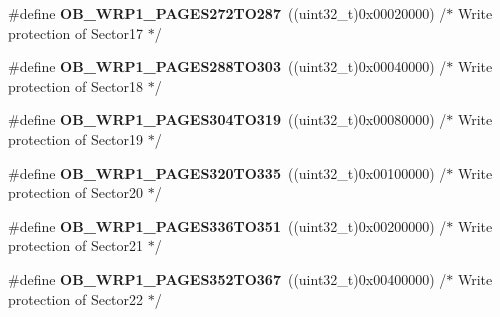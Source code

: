 \begin{DoxyCompactItemize}
\item 
\hypertarget{group___f_l_a_s_h_ex___option___bytes___write___protection1_gaeeca9479f273ad1e6792a297e801ef18}{\#define {\bfseries O\-B\-\_\-\-W\-R\-P1\-\_\-\-P\-A\-G\-E\-S272\-T\-O287}~((uint32\-\_\-t)0x00020000) /$\ast$ Write protection of Sector17 $\ast$/}\label{group___f_l_a_s_h_ex___option___bytes___write___protection1_gaeeca9479f273ad1e6792a297e801ef18}

\item 
\hypertarget{group___f_l_a_s_h_ex___option___bytes___write___protection1_ga16971dcdfbafabfe552b5d8f3aa78468}{\#define {\bfseries O\-B\-\_\-\-W\-R\-P1\-\_\-\-P\-A\-G\-E\-S288\-T\-O303}~((uint32\-\_\-t)0x00040000) /$\ast$ Write protection of Sector18 $\ast$/}\label{group___f_l_a_s_h_ex___option___bytes___write___protection1_ga16971dcdfbafabfe552b5d8f3aa78468}

\item 
\hypertarget{group___f_l_a_s_h_ex___option___bytes___write___protection1_gaa1bd7bb5b0e9c2171c13f08967119a89}{\#define {\bfseries O\-B\-\_\-\-W\-R\-P1\-\_\-\-P\-A\-G\-E\-S304\-T\-O319}~((uint32\-\_\-t)0x00080000) /$\ast$ Write protection of Sector19 $\ast$/}\label{group___f_l_a_s_h_ex___option___bytes___write___protection1_gaa1bd7bb5b0e9c2171c13f08967119a89}

\item 
\hypertarget{group___f_l_a_s_h_ex___option___bytes___write___protection1_ga0e3542f2b50f94ad6ad4bad0d1ac4a1f}{\#define {\bfseries O\-B\-\_\-\-W\-R\-P1\-\_\-\-P\-A\-G\-E\-S320\-T\-O335}~((uint32\-\_\-t)0x00100000) /$\ast$ Write protection of Sector20 $\ast$/}\label{group___f_l_a_s_h_ex___option___bytes___write___protection1_ga0e3542f2b50f94ad6ad4bad0d1ac4a1f}

\item 
\hypertarget{group___f_l_a_s_h_ex___option___bytes___write___protection1_ga843ceb8570515e4a1308161488d2eaed}{\#define {\bfseries O\-B\-\_\-\-W\-R\-P1\-\_\-\-P\-A\-G\-E\-S336\-T\-O351}~((uint32\-\_\-t)0x00200000) /$\ast$ Write protection of Sector21 $\ast$/}\label{group___f_l_a_s_h_ex___option___bytes___write___protection1_ga843ceb8570515e4a1308161488d2eaed}

\item 
\hypertarget{group___f_l_a_s_h_ex___option___bytes___write___protection1_gae261af190c20db2e3c94db13324644fc}{\#define {\bfseries O\-B\-\_\-\-W\-R\-P1\-\_\-\-P\-A\-G\-E\-S352\-T\-O367}~((uint32\-\_\-t)0x00400000) /$\ast$ Write protection of Sector22 $\ast$/}\label{group___f_l_a_s_h_ex___option___bytes___write___protection1_gae261af190c20db2e3c94db13324644fc}


\end{DoxyCompactItemize}
